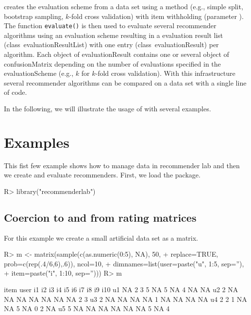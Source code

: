 \documentclass[nojss]{jss}
\newcommand{\class}[1]{\mbox{\textsf{#1}}}
\newcommand{\func}[1]{\mbox{\texttt{#1()}}}
\begin{document}
\begin{center}
\end{center}

creates the evaluation scheme from a data set using a method
(e.g., simple split, bootstrap sampling, $k$-fold cross validation)
with item withholding (parameter ).
The function \func{evaluate} is then used to
evaluate several recommender algorithms using an evaluation scheme resulting
in a evaluation result list (class~\class{evaluationResultList}) with
one entry (class~\class{evaluationResult}) per algorithm.
Each object of \class{evaluationResult}
contains one or several object of \class{confusionMatrix} depending on the
number of evaluations specified in the \class{evaluationScheme} (e.g., $k$
for $k$-fold cross validation).
With this infrastructure several recommender algorithms can be compared
on a data set with a single line of code.

In the following, we will illustrate the usage of 
with several examples.
\section{Examples}
\label{sec:examples}
This fist few example shows how to manage data in recommender lab and then
we create and evaluate recommenders.
First, we load the package.

\begin{Schunk}
\begin{Sinput}
R> library("recommenderlab")
\end{Sinput}
\end{Schunk}

\subsection{Coercion to and from rating matrices}

For this example we create a small
artificial data set as a matrix.

\begin{Schunk}
\begin{Sinput}
R> m <- matrix(sample(c(as.numeric(0:5), NA), 50,
+     replace=TRUE, prob=c(rep(.4/6,6),.6)), ncol=10,
+     dimnames=list(user=paste("u", 1:5, sep=''),
+ 	item=paste("i", 1:10, sep='')))
R> m
\end{Sinput}
\begin{Soutput}
    item
user i1 i2 i3 i4 i5 i6 i7 i8 i9 i10
  u1 NA  2  3  5 NA  5 NA  4 NA  NA
  u2  2 NA NA NA NA NA NA NA  2   3
  u3  2 NA NA NA NA  1 NA NA NA  NA
  u4  2  2  1 NA NA  5 NA  0  2  NA
  u5  5 NA NA NA NA NA NA  5 NA   4
\end{Soutput}
\end{Schunk}
\end{document}
